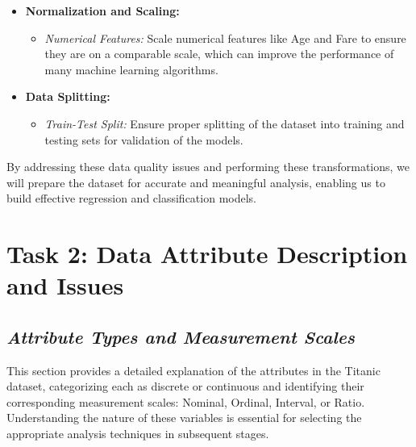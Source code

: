 \documentclass[twoside,11pt]{article}
\makeatletter
\let\@oldsection\section
\renewcommand\section[1]{\@oldsection*{#1}}
\let\@oldsubsection\subsection
\renewcommand\subsection[1]{\@oldsubsection*{\textit{#1}}}
\makeatother
\begin{document}
\begin{itemize}
\begin{itemize}
    \end{itemize}
    \item \textbf{Normalization and Scaling:}
    \begin{itemize}
        \item \textit{Numerical Features:} Scale numerical features like Age and Fare to ensure they are on a comparable scale, which can improve the performance of many machine learning algorithms.
    \end{itemize}
    \item \textbf{Data Splitting:}
    \begin{itemize}
        \item \textit{Train-Test Split:} Ensure proper splitting of the dataset into training and testing sets for validation of the models.
    \end{itemize}
\end{itemize}

By addressing these data quality issues and performing these transformations, we will prepare the dataset for accurate and meaningful analysis, enabling us to build effective regression and classification models.


\section{Task 2: Data Attribute Description and Issues}

\subsection{Attribute Types and Measurement Scales}
This section provides a detailed explanation of the attributes in the Titanic dataset, categorizing each as discrete or continuous and identifying their corresponding measurement scales: Nominal, Ordinal, Interval, or Ratio. Understanding the nature of these variables is essential for selecting the appropriate analysis techniques in subsequent stages.
\end{document}
